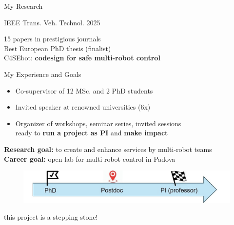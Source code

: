 \documentclass[10pt,xcolor={dvipsnames}]{beamer}
\begin{document}
\begin{frame}{My Research}
\begin{minipage}[l]{.45\linewidth}
			\begin{block}
				{\tiny
					IEEE Trans. Veh. Technol. 2025}
			\end{block}
		\end{minipage}%
		\begin{minipage}[r]{.55\linewidth}
			{\small
				\checkmark \hspace{1mm}15 papers in prestigious journals\\
				\checkmark \hspace{1mm}Best European PhD thesis (finalist)\vspace{2mm}\\
				C4SEbot: \textbf{codesign for safe multi-robot control}}\vspace{2mm}
		\end{minipage}
		
	\end{frame}
	
	\begin{frame}{My Experience and Goals}
		
		\begin{itemize}[label=\checkmark]
			\item Co-supervisor of 12 MSc. and 2 PhD students
			\item Invited speaker at renowned universities (6x)
			\item Organizer of workshops, seminar series, invited sessions\\\vspace{1mm}
			\hspace{5mm} ready to \textbf{run a project as PI} and \textbf{make impact}
		\end{itemize}
		\vspace{.3cm}
		\textbf{Research goal:} to create and enhance services by multi-robot teams\\
		\vspace{.2cm}
		\textbf{Career goal:} open lab for multi-robot control in Padova
		\begin{figure}
			\centering
			\includegraphics[width=\linewidth]{career}
			\vspace{-.7cm}
		\end{figure}
		\hspace{5mm} this project is a stepping stone!
		
	\end{frame}
	
\end{document}
